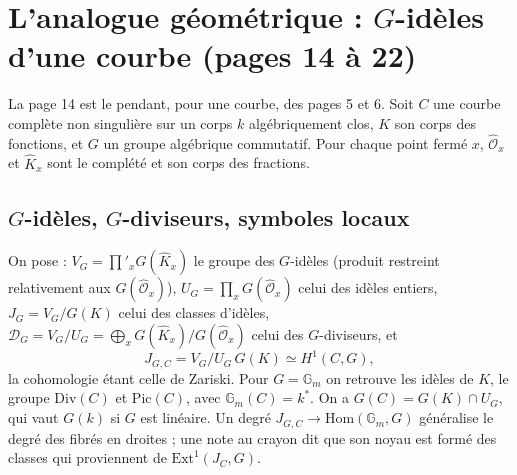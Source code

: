 \documentclass[11pt,a4paper]{article}
\begin{document}
\section*{L'analogue géométrique : $G$-idèles d'une courbe (pages 14 à 22)}

La page 14 est le pendant, pour une courbe, des pages 5 et 6. Soit $C$ une courbe
complète non singulière sur un corps $k$ algébriquement clos, $K$ son corps des
fonctions, et $G$ un groupe algébrique commutatif. Pour chaque point fermé $x$,
$\hat{\mathcal{O}}_x$ et $\hat K_x$ sont le complété et son corps des fractions.

\subsection*{$G$-idèles, $G$-diviseurs, symboles locaux}

On pose : $V_G = \prod'_x G(\hat K_x)$ le groupe des $G$-idèles (produit restreint
relativement aux $G(\hat{\mathcal{O}}_x)$), $U_G = \prod_x G(\hat{\mathcal{O}}_x)$
celui des idèles entiers, $J_G = V_G/G(K)$ celui des classes d'idèles,
$\mathcal{D}_G = V_G/U_G = \bigoplus_x G(\hat K_x)/G(\hat{\mathcal{O}}_x)$ celui des
$G$-diviseurs, et
\[
J_{G,C} = V_G/U_G\,G(K) \simeq H^1(C, G),
\]
la cohomologie étant celle de Zariski. Pour $G = \mathbb{G}_m$ on retrouve les
idèles de $K$, le groupe $\mathrm{Div}(C)$ et $\mathrm{Pic}(C)$, avec
$\mathbb{G}_m(C) = k^{*}$. On a $G(C) = G(K) \cap U_G$, qui vaut $G(k)$ si $G$ est
linéaire. Un degré $J_{G,C} \to \mathrm{Hom}(\mathbb{G}_m, G)$ généralise le
degré des fibrés en droites ; une note au crayon dit que son noyau est formé des
classes qui proviennent de $\mathrm{Ext}^1(J_C, G)$.
\end{document}
